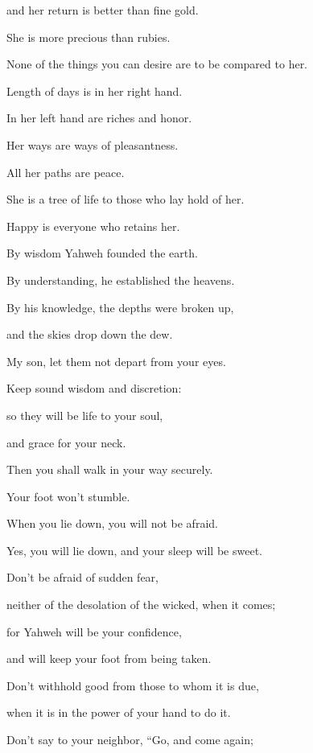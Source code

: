 {\par }{\QB and her return is better than fine gold.
\par }{\Q {}She is more precious than rubies.
\par }{\QB None of the things you can desire are to be compared to her.
\par }{\Q {}Length of days is in her right hand.
\par }{\QB In her left hand are riches and honor.
\par }{\Q {}Her ways are ways of pleasantness.
\par }{\QB All her paths are peace.
\par }{\Q {}She is a tree of life to those who lay hold of her.
\par }{\QB Happy is everyone who retains her.
\par }{\Q {}By wisdom Yahweh founded the earth.
\par }{\QB By understanding, he established the heavens.
\par }{\Q {}By his knowledge, the depths were broken up,
\par }{\QB and the skies drop down the dew.
\par }{\Q {}My son, let them not depart from your eyes.
\par }{\QB Keep sound wisdom and discretion:
\par }{\Q {}so they will be life to your soul,
\par }{\QB and grace for your neck.
\par }{\Q {}Then you shall walk in your way securely.
\par }{\QB Your foot won’t stumble.
\par }{\Q {}When you lie down, you will not be afraid.
\par }{\QB Yes, you will lie down, and your sleep will be sweet.
\par }{\Q {}Don’t be afraid of sudden fear,
\par }{\QB neither of the desolation of the wicked, when it comes;
\par }{\Q {}for Yahweh will be your confidence,
\par }{\QB and will keep your foot from being taken.
\par }{\BB \par }{\Q {}Don’t withhold good from those to whom it is due,
\par }{\QB when it is in the power of your hand to do it.
\par }{\Q {}Don’t say to your neighbor, “Go, and come again;
}
